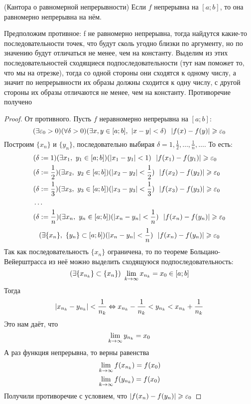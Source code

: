 \begin{theorem} (Кантора о равномерной непрерывности)
	Если $f$ непрерывна на $[a; b]$, то она равномерно
	непрерывна на нём.
\end{theorem}

\begin{idea}
	Предположим противное: f не равномерно непрерывна,
	тогда найдутся какие-то последовательности точек, что
	будут сколь угодно близки по аргументу, но по значению
	будут отличаться не менее, чем на константу. Выделим из
	этих последовательностей сходящиеся подпоследовательности
	(тут нам поможет то, что мы на отрезке), тогда со одной
	стороны они сходятся к одному числу, а значит по
	непрерывности их образы должны сходится к одну числу,
	с другой стороны их образы отличаются не менее, чем на
	константу. Противоречие получено
\end{idea}

\begin{proof}
	От противного. Пусть $f$ неравномерно непрерывна на $[a; b]$:
	\[
		(\exists \varepsilon_0 > 0)(\forall \delta > 0)
		(\exists x, y \in [a; b],\ |x - y| < \delta)
		\ \ |f(x) - f(y)| \geqslant \varepsilon_0
	\]
	Построим $\{x_n\}$ и $\{y_n\}$, последовательно выбирая
	$\delta = 1, \frac{1}{2}, \ldots, \frac{1}{n}, \ldots$.
	То есть:
	\begin{align*}
		&(\delta := 1)(\exists x_1,\ y_1 \in [a; b])
		(|x_1 - y_1| < 1)\ \ |f(x_1) - f(y_1)| \geqslant \varepsilon_0\\
		&(\delta := \frac{1}{2})(\exists x_2,\ y_2 \in [a; b])
		(|x_2 - y_2| < \frac{1}{2})\ \ |f(x_2) - f(y_2)| \geqslant \varepsilon_0\\
		&(\delta := \frac{1}{3})(\exists x_3,\ y_3 \in [a; b])
		(|x_3 - y_3| < \frac{1}{3})\ \ |f(x_3) - f(y_3)| \geqslant \varepsilon_0\\
		&\ldots\\
		&(\delta := \frac{1}{n})(\exists x_n,\ y_n \in [a; b])
		(|x_n - y_n| < \frac{1}{n})\ \ |f(x_n) - f(y_n)|
		\geqslant \varepsilon_0
	\end{align*}
	\[
		(\exists \{x_n\},\ \{y_n\} \subset [a; b])
	    (|x_n - y_n| < \frac{1}{n})\ \ |f(x_n) - f(y_n)|
		\ge \eps_0
	\]
	Так как последовательность $\{x_n\}$ ограничена,
	то по теореме Больцано-Вейерштрасса из неё можно
	выделить сходящуюся подпоследовательность:
	\[
		(\exists \{x_{n_k}\} \subset \{x_n\})\ 
		\liml_{k \to \infty} x_{n_k} = x_0 \in [a; b]
	\]
	Тогда
	\[
		|x_{n_k} - y_{n_k}| < \frac{1}{n_k} \Leftrightarrow x_{n_k} -
		\frac{1}{n_k} < y_{n_k} < x_{n_k} + \frac{1}{n_k}
	\]
	Это нам даёт, что
	\[
		\lim\limits_{k \to \infty} y_{n_k} = x_0
	\]
	А раз функция непрерывна, то верны равенства
	\begin{align*}
		&\lim\limits_{k \to \infty} f(x_{n_k}) = f(x_0)
		\\
		&\lim\limits_{k \to \infty} f(y_{n_k}) = f(x_0)
	\end{align*}
	Получили противоречие с условием, что $|f(x_n) - f(y_n)|
	\geqslant \varepsilon_0$
\end{proof}

